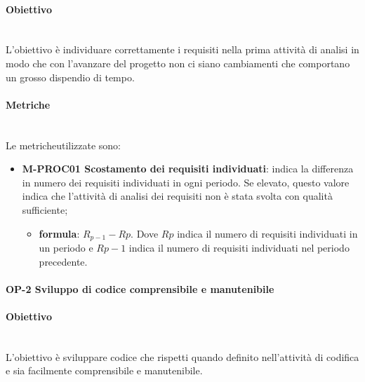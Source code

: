 		\paragraph*{Obiettivo}\mbox{}\\ [1mm]
		L'obiettivo è individuare correttamente i requisiti nella prima attività di analisi in modo che con l'avanzare del progetto non ci siano cambiamenti che comportano un grosso dispendio di tempo.
		\paragraph*{Metriche}\mbox{}\\ [1mm]
		Le metriche\glosp utilizzate sono:
		\begin{itemize}
			\item \textbf{M-PROC01 Scostamento dei requisiti individuati}: indica la differenza in numero dei requisiti individuati in ogni periodo. Se elevato, questo valore indica che l'attività di analisi dei requisiti non è stata svolta con qualità sufficiente;
			\begin{itemize}
				\item[] \textbf{formula}: $R_{p-1}-R{p}$. Dove $R{p}$ indica il numero di requisiti individuati in un periodo e $R{p-1}$ indica il numero di requisiti individuati nel periodo precedente.
			\end{itemize} 
		\end{itemize}		
		\paragraph{OP-2 Sviluppo di codice comprensibile e manutenibile}
		\paragraph*{Obiettivo}\mbox{}\\ [1mm]
		L'obiettivo è sviluppare codice che rispetti quando definito nell'attività di codifica e sia facilmente comprensibile e manutenibile.
